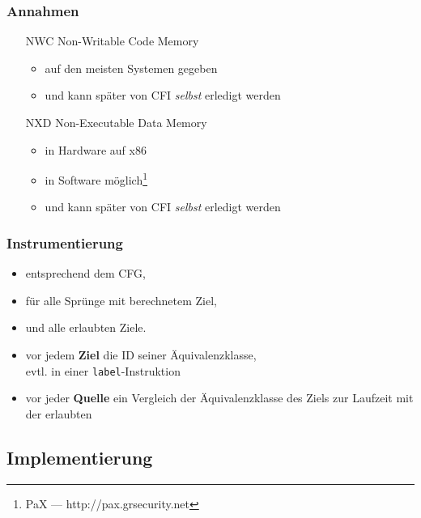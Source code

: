 \documentclass[mathserif,slidestop,compress,red]{beamer}
\begin{document}
\begin{frame}
  \frametitle{Annahmen}
  \begin{itemize}
    \item[NWC] Non-Writable Code Memory
    \begin{itemize}
      \item auf den meisten Systemen gegeben
      \pause
      \item und kann später von CFI \emph{selbst} erledigt werden
    \end{itemize}
    \pause
    \item[NXD] Non-Executable Data Memory
    \begin{itemize}
      \item in Hardware auf x86
      \item in Software möglich\footnote{PaX — http://pax.grsecurity.net}
      \pause
      \item und kann später von CFI \emph{selbst} erledigt werden
    \end{itemize}
  \end{itemize}
\end{frame}

\begin{frame}
  \frametitle{Instrumentierung}
  \begin{itemize}
    \item entsprechend dem CFG,
    \item für alle Sprünge mit berechnetem Ziel,
    \item und alle erlaubten Ziele.
  \end{itemize}
  \begin{itemize}
    \item vor jedem \textbf{Ziel} die ID seiner Äquivalenzklasse,\\ evtl. in einer
    \texttt{label}-Instruktion
    \item vor jeder \textbf{Quelle} ein Vergleich der Äquivalenzklasse des
    Ziels zur Laufzeit mit der erlaubten
  \end{itemize}
\end{frame}

\subsection{Implementierung}
\end{document}
